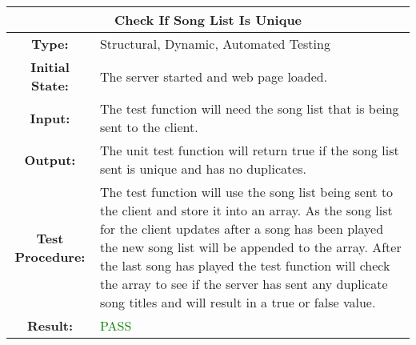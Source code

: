 \documentclass[12pt, titlepage]{article}
\begin{document}
\begin{center}
\begin{table}[H]
\begin{tabularx}{\textwidth}{| c X |}
\hline
\multicolumn{2}{|c|}{\textbf{Check If Song List Is Unique}}\\
\hline
\textbf{Type: } & Structural, Dynamic, Automated Testing\\


\textbf{Initial State: } & The server started and web page loaded.\\


\textbf{Input: } & The test function will need the song list that is being sent to the client.\\


\textbf{Output: } & The unit test function will return true if the song list sent is unique and has no duplicates.\\


\textbf{Test Procedure: } &The test function will use the song list being sent to the client and store it into an array. As the song list for the client updates after a song has been played the new song list will be appended to the array. After the last song has played the test function will check the array to see if the server has sent any duplicate song titles and will result in a true or false value. \\


\textbf{Result: } & \textcolor{green}{PASS}\\
\hline
\end{tabularx}
\end{table}
\end{center}
\end{document}
